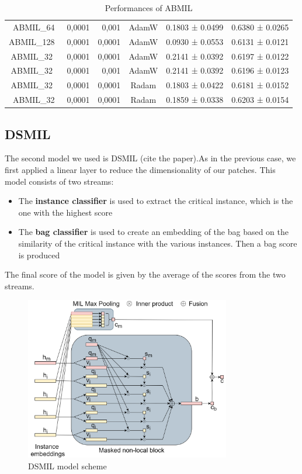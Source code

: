 \documentclass{article}
\begin{document}
\begin{table}[h]
\begin{tabular}{|c|crc|c|c|}
		ABMIL\_64 & 0,0001 & 0,001 & AdamW & 0.1803 ± 0.0499 & 0.6380 ± 0.0265\\
		ABMIL\_128\ & 0,0001 & 0,0001 & AdamW & 0.0930 ± 0.0553&0.6131 ± 0.0121\\
		ABMIL\_32\ & 0,0001 & 0,0001 & AdamW &  0.2141 ± 0.0392&0.6197 ± 0.0122\\
		ABMIL\_32\ & 0,0001 & 0,001 & AdamW & 0.2141 ± 0.0392&0.6196 ± 0.0123\\
		ABMIL\_32\ & 0,0001 & 0,0001 & Radam & 0.1803 ± 0.0422&0.6181 ± 0.0152\\
		ABMIL\_32 & 0,0001 & 0,0001 & Radam & 0.1859 ± 0.0338&0.6203 ± 0.0154\\
		\hline
	\end{tabular}
	\caption{Performances of ABMIL }
\end{table}


\clearpage
\subsection{DSMIL}
The second model we used is DSMIL (cite the paper).As in the previous case, we first applied a linear layer to reduce the dimensionality of our patches.
This model consists of two streams:
\begin{itemize}
	\item The \textbf{instance classifier} is used to extract the critical instance, which is the one with the highest score
	\item The \textbf{bag classifier} is used to create an embedding of the bag based on the similarity of the critical instance with the various instances. Then a bag score is produced
\end{itemize}
The final score of the model is given by the average of the scores from the two streams.

\begin{figure}[h]
	\centering
	\includegraphics[width=0.8\textwidth]{images/dsmil.png}
	\caption{DSMIL model scheme}
\end{figure}
\end{document}
